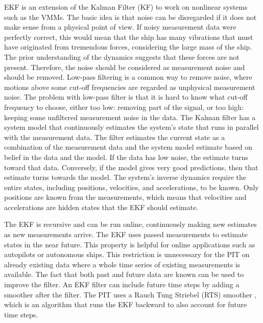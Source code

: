 EKF is an extension of the Kalman Filter (KF) to work on nonlinear systems such as the VMMs. The basic idea is that noise can be disregarded if it does not make sense from a physical point of view. If noisy measurement data were perfectly correct, this would mean that the ship has many vibrations that must have originated from tremendous forces, considering the large mass of the ship. The prior understanding of the dynamics suggests that these forces are not present. Therefore, the noise should be considered as measurement noise and should be removed. Low-pass filtering is a common way to remove noise, where motions above some cut-off frequencies are regarded as unphysical measurement noise. The problem with low-pass filter is that it is hard to know what cut-off frequency to choose, either too low: removing part of the signal, or too high: keeping some unfiltered measurement noise in the data. The Kalman filter has a system model that continuously estimates the system’s state that runs in parallel with the measurement data. The filter estimates the current state as a combination of the measurement data and the system model estimate based on belief in the data and the model. If the data has low noise, the estimate turns toward that data. Conversely, if the model gives very good predictions, then that estimate turns towards the model.
The system’s inverse dynamics require the entire states, including positions, velocities, and accelerations, to be known. Only positions are known from the measurements, which means that velocities and accelerations are hidden states that the EKF should estimate.

The EKF is recursive and can be run online, continuously making new estimates as new measurements arrive. The EKF uses passed measurements to estimate states in the near future. This property is helpful for online applications such as  autopilots or autonomous ships. This restriction is  unnecessary for the PIT on already existing data where a whole time series of existing measurements is available. The fact that both past and future data are known can be used to improve the filter. An EKF filter can include future time steps by adding a smoother after the filter. The PIT uses a Rauch Tung Striebel (RTS) smoother \cite{rauch_maximum_1965}, which is an algorithm that runs the EKF backward to also account for future time steps.



